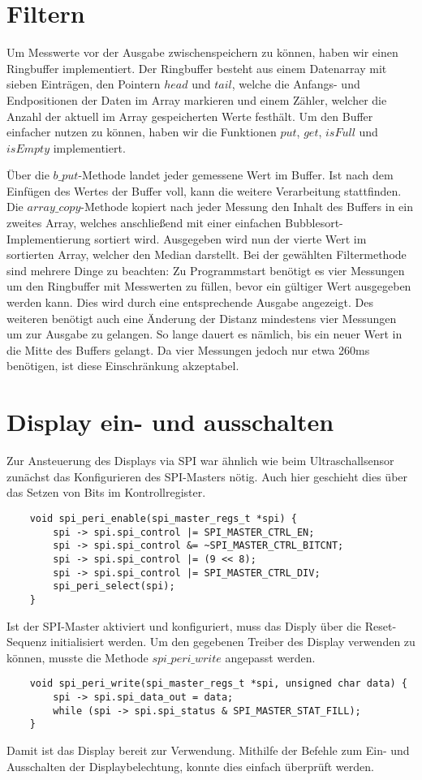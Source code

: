 \documentclass[parskip,
							 oneside,
							 11pt,
							 noheadingspace,
							 accentcolor=tud1d,
							 bigchapter,
							 colorback]{tudreport}
\begin{document}
\section{Filtern}

	Um Messwerte vor der Ausgabe zwischenspeichern zu können, haben wir einen Ringbuffer implementiert. Der Ringbuffer besteht aus einem Datenarray mit sieben Einträgen, den Pointern $head$ und $tail$, welche die Anfangs- und Endpositionen der Daten im Array markieren und einem Zähler, welcher die Anzahl der aktuell im Array gespeicherten Werte festhält. Um den Buffer einfacher nutzen zu können, haben wir die Funktionen $put$, $get$, $isFull$ und $isEmpty$ implementiert. 
	
	Über die $b\_put$-Methode landet jeder gemessene Wert im Buffer. Ist nach dem Einfügen des Wertes der Buffer voll, kann die weitere Verarbeitung stattfinden. Die $array\_copy$-Methode kopiert nach jeder Messung den Inhalt des Buffers in ein zweites Array, welches anschließend mit einer einfachen Bubblesort-Implementierung sortiert wird. Ausgegeben wird nun der vierte Wert im sortierten Array, welcher den Median darstellt. 
Bei der gewählten Filtermethode sind mehrere Dinge zu beachten:
	Zu Programmstart benötigt es vier Messungen um den Ringbuffer mit Messwerten zu füllen, bevor ein gültiger Wert ausgegeben werden kann. Dies wird durch eine entsprechende Ausgabe angezeigt. Des weiteren benötigt auch eine Änderung der Distanz mindestens vier Messungen um zur Ausgabe zu gelangen. So lange dauert es nämlich, bis ein neuer Wert in die Mitte des Buffers gelangt. Da vier Messungen jedoch nur etwa 260ms benötigen, ist diese Einschränkung akzeptabel.
	
	
\section{Display ein- und ausschalten}
	Zur Ansteuerung des Displays via SPI war ähnlich wie beim Ultraschallsensor zunächst das Konfigurieren des SPI-Masters nötig. Auch hier geschieht dies über das Setzen von Bits im Kontrollregister. 
	\begin{lstlisting}
	void spi_peri_enable(spi_master_regs_t *spi) {
		spi -> spi.spi_control |= SPI_MASTER_CTRL_EN;
		spi -> spi.spi_control &= ~SPI_MASTER_CTRL_BITCNT;
		spi -> spi.spi_control |= (9 << 8);
		spi -> spi.spi_control |= SPI_MASTER_CTRL_DIV;
		spi_peri_select(spi);
	}
\end{lstlisting}
 	Ist der SPI-Master aktiviert und konfiguriert, muss das Disply über die Reset-Sequenz initialisiert werden. Um den gegebenen Treiber des Display verwenden zu können, musste die Methode $spi\_peri\_write$ angepasst werden. 
 	\begin{lstlisting}
 	void spi_peri_write(spi_master_regs_t *spi, unsigned char data) {
		spi -> spi.spi_data_out = data;	
		while (spi -> spi.spi_status & SPI_MASTER_STAT_FILL);
	} 
	\end{lstlisting}
Damit ist das Display bereit zur Verwendung. Mithilfe der Befehle zum Ein- und Ausschalten der Displaybelechtung, konnte dies einfach überprüft werden. 
\end{document}
